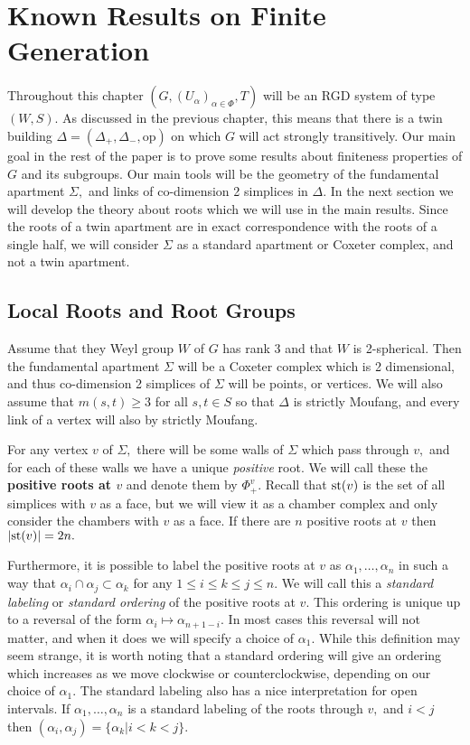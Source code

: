 \documentclass[class=book, crop=false,12 pt]{standalone}
\begin{document}
\chapter{Known Results on Finite Generation}
\label{ch:known}

Throughout this chapter $(G,(U_\alpha)_{\alpha\in \Phi},T)$ will be an RGD system of type $(W,S).$ As discussed in the previous chapter, this means that there is a twin building $\Delta=(\Delta_+,\Delta_-,\mathrm{op})$ on which $G$ will act strongly transitively. Our main goal in the rest of the paper is to prove some results about finiteness properties of $G$ and its subgroups. Our main tools will be the geometry of the fundamental apartment $\Sigma,$ and links of co-dimension 2 simplices in $\Delta.$ In the next section we will develop the theory about roots which we will use in the main results. Since the roots of a twin apartment are in exact correspondence with the roots of a single half, we will consider $\Sigma$ as a standard apartment or Coxeter complex, and not a twin apartment.

\section{Local Roots and Root Groups}
Assume that they Weyl group $W$ of $G$ has rank 3 and that $W$ is 2-spherical. Then the fundamental apartment $\Sigma$ will be a Coxeter complex which is 2 dimensional, and thus co-dimension 2 simplices of $\Sigma$ will be points, or vertices. We will also assume that $m(s,t)\ge 3$ for all $s,t\in S$ so that $\Delta$ is strictly Moufang, and every link of a vertex will also by strictly Moufang.

For any vertex $v$ of $\Sigma,$ there will be some walls of $\Sigma$ which pass through $v,$ and for each of these walls we have a unique \emph{positive} root. We will call these the \textbf{positive roots at $v$} and denote them by $\Phi_+^v.$ Recall that $\mathrm{st}(v)$ is the set of all simplices with $v$ as a face, but we will view it as a chamber complex and only consider the chambers with $v$ as a face. If there are $n$ positive roots at $v$ then $|\mathrm{st}(v)|=2n.$ 

Furthermore, it is possible to label the positive roots at $v$ as $\alpha_1,\dots,\alpha_n$ in such a way that $\alpha_i\cap \alpha_j\subset \alpha_k$ for any $1\le i\le k\le j\le n.$ We will call this a \emph{standard labeling} or \emph{standard ordering} of the positive roots at $v.$ This ordering is unique up to a reversal of the form $\alpha_i\mapsto \alpha_{n+1-i}.$ In most cases this reversal will not matter, and when it does we will specify a choice of $\alpha_1.$ While this definition may seem strange, it is worth noting that a standard ordering will give an ordering which increases as we move clockwise or counterclockwise, depending on our choice of $\alpha_1.$ The standard labeling also has a nice interpretation for open intervals. If $\alpha_1,\dots,\alpha_n$ is a standard labeling of the roots through $v,$ and $i<j$ then $(\alpha_i,\alpha_j)=\{\alpha_k|i<k<j\}.$
\end{document}
